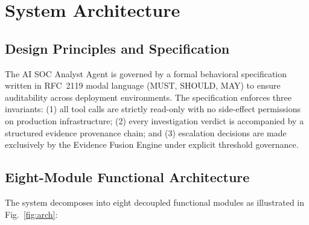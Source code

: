 \section{System Architecture}
\label{sec:arch}

\subsection{Design Principles and Specification}

The AI SOC Analyst Agent is governed by a formal behavioral specification written
in RFC~2119 modal language (MUST, SHOULD, MAY) to ensure auditability across
deployment environments. The specification enforces three invariants: (1) all
tool calls are strictly read-only with no side-effect permissions on production
infrastructure; (2) every investigation verdict is accompanied by a structured
evidence provenance chain; and (3) escalation decisions are made exclusively by the
Evidence Fusion Engine under explicit threshold governance.

\subsection{Eight-Module Functional Architecture}

The system decomposes into eight decoupled functional modules as illustrated
in Fig.~\ref{fig:arch}:

